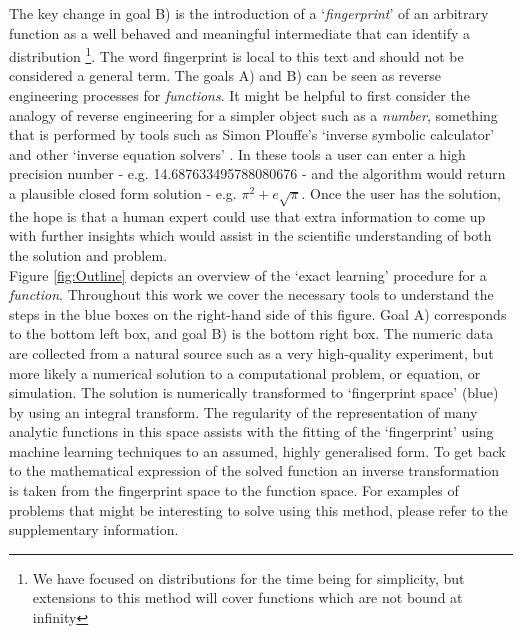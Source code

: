 \documentclass{article}
\begin{document}
The key change in goal B) is the introduction of a `\emph{fingerprint}' of an arbitrary function as a well behaved and meaningful intermediate that can identify a distribution \footnote{We have focused on distributions for the time being for simplicity, but extensions to this method will cover functions which are not bound at infinity}. The word fingerprint is local to this text and should not be considered a general term. The goals A) and B) can be seen as reverse engineering processes for \emph{functions}. It might be helpful to first consider the analogy of reverse engineering for a simpler object such as a \emph{number}, something that is performed by tools such as Simon Plouffe's `inverse symbolic calculator' \cite{Plouffe1986} and other `inverse equation solvers' \cite{Munafo}. In these tools a user can enter a high precision number - e.g. 14.687633495788080676 - and the algorithm would return a plausible closed form solution - e.g. $\pi^2 + e\sqrt{\pi}$. Once the user has the solution, the hope is that a human expert could use that extra information to come up with further insights which would assist in the scientific understanding of both the solution and problem.\\ 

Figure \ref{fig:Outline} depicts an overview of the `exact learning' procedure for a \emph{function}. Throughout this work we cover the necessary tools to understand the steps in the blue boxes on the right-hand side of this figure. Goal A) corresponds to the bottom left box, and goal B) is the bottom right box. The numeric data are collected from a natural source such as a very high-quality experiment, but more likely a numerical solution to a computational problem, or equation, or simulation. The solution is numerically transformed to `fingerprint space' (blue) by using an integral transform. The regularity of the representation of many analytic functions in this space assists with the fitting of the `fingerprint' using machine learning techniques to an assumed, highly generalised form. To get back to the mathematical expression of the solved function an inverse transformation is taken from the  fingerprint space to the function space. For examples of problems that might be interesting to solve using this method, please refer to the supplementary information. \\
\end{document}
